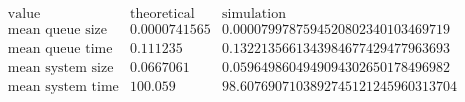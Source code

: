 \[\begin{array}{cccc}
 \text{value} & \text{theoretical} & \text{simulation} & \text{} \\
 \text{mean queue size} & 0.0000741565 & 0.0000799787594520802340103469719 & \text{} \\
 \text{mean queue time} & 0.111235 & 0.1322135661343984677429477963693 & \text{} \\
 \text{mean system size} & 0.0667061 & 0.0596498604949094302650178496982 & \text{} \\
 \text{mean system time} & 100.059 & 98.6076907103892745121245960313704 & \text{} \\
\end{array}\]

